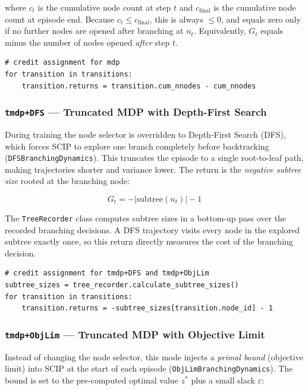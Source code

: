 where $c_t$ is the cumulative node count at step $t$ and $c_{\text{final}}$ is the cumulative node count at episode end. Because $c_t \leq c_{\text{final}}$, this is always $\leq 0$, and equals zero only if no further nodes are opened after branching at $n_t$. Equivalently, $G_t$ equals minus the number of nodes opened \emph{after} step $t$.

\begin{lstlisting}
# credit assignment for mdp
for transition in transitions:
    transition.returns = transition.cum_nnodes - cum_nnodes
\end{lstlisting}

\subsubsection{\texttt{tmdp+DFS} --- Truncated MDP with Depth-First Search}

During training the node selector is overridden to Depth-First Search (DFS), which forces SCIP to explore one branch completely before backtracking (\texttt{DFSBranchingDynamics}). This truncates the episode to a single root-to-leaf path, making trajectories shorter and variance lower. The return is the \emph{negative subtree size} rooted at the branching node:

\[
    G_t = -|\mathrm{subtree}(n_t)| - 1
\]

The \texttt{TreeRecorder} class computes subtree sizes in a bottom-up pass over the recorded branching decisions. A DFS trajectory visits every node in the explored subtree exactly once, so this return directly measures the cost of the branching decision.

\begin{lstlisting}
# credit assignment for tmdp+DFS and tmdp+ObjLim
subtree_sizes = tree_recorder.calculate_subtree_sizes()
for transition in transitions:
    transition.returns = -subtree_sizes[transition.node_id] - 1
\end{lstlisting}

\subsubsection{\texttt{tmdp+ObjLim} --- Truncated MDP with Objective Limit}

Instead of changing the node selector, this mode injects a \emph{primal bound} (objective limit) into SCIP at the start of each episode (\texttt{ObjLimBranchingDynamics}). The bound is set to the pre-computed optimal value $z^*$ plus a small slack $\varepsilon$:


